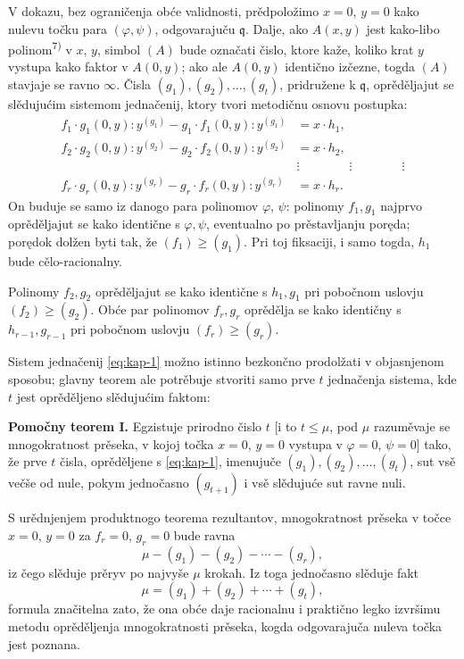 \documentclass[11pt]{article}
\theoremstyle{plain}
\begin{document}
V dokazu, bez ograničenja obće validnosti, prědpoložimo $x = 0$,
$y = 0$ kako nulevu točku para $(\varphi, \psi)$, odgovarajuču
$\mathfrak{q}$. Dalje, ako $A(x,y)$ jest kako-libo polinom\textsuperscript{7)}
v $x$, $y$, simbol $(A)$ bude označati čislo, ktore kaže, koliko
krat $y$ vystupa kako faktor v $A(0,y)$; ako ale $A(0,y)$
identično izčezne, togda $(A)$ stavjaje se ravno $\infty$. Čisla
$(g_{1}), (g_{2}), \ldots, (g_{t})$, pridružene k $\mathfrak{q}$,
oprěděljajut se slědujućim sistemom jednačenij, ktory tvori
metodičnu osnovu postupka:
\begin{equation}\label{eq:kap-1}
\begin{aligned}
f_{1}\cdot g_{1}(0,y):y^{(g_{1})} - g_{1}\cdot f_{1}(0,y):y^{(g_{1})} &= x\cdot h_{1},\\
f_{2}\cdot g_{2}(0,y):y^{(g_{2})} - g_{2}\cdot f_{2}(0,y):y^{(g_{2})} &= x\cdot h_{2},\\
&\vdots \qquad\qquad\vdots\qquad\qquad\vdots\\
f_{r}\cdot g_{r}(0,y):y^{(g_{r})} - g_{r}\cdot f_{r}(0,y):y^{(g_{r})} &= x\cdot h_{r}.
\end{aligned}
\end{equation}
On buduje se samo iz danogo para polinomov $\varphi$, $\psi$:
polinomy $f_{1}, g_{1}$ najprvo oprěděljajut se kako identične s
$\varphi, \psi$, eventualno po prěstavljanju poręda; porędok
dolžen byti tak, že $(f_{1}) \geq (g_{1})$. Pri toj fiksaciji, i
samo togda, $h_{1}$ bude cělo-racionalny.

Polinomy $f_{2}, g_{2}$ oprěděljajut se kako identične s
$h_{1}, g_{1}$ pri pobočnom uslovju $(f_{2}) \geq (g_{2})$. Obće par
polinomov $f_{r}, g_{r}$ oprědělja se kako identičny s
$h_{r-1}, g_{r-1}$ pri pobočnom uslovju $(f_{r}) \geq (g_{r})$.

Sistem jednačenij \eqref{eq:kap-1} možno istinno bezkončno
prodolžati v objasnjenom sposobu; glavny teorem ale potrěbuje
stvoriti samo prve $t$ jednačenja sistema, kde $t$ jest oprěděljeno
slědujućim faktom:

\smallskip
\textbf{Pomočny teorem I.} Egzistuje prirodno čislo $t$ [i to
$t \leq \mu$, pod $\mu$ razuměvaje se mnogokratnost prěseka, v kojoj
točka $x = 0$, $y = 0$ vystupa v $\varphi = 0$, $\psi = 0$] tako, že
prve $t$ čisla, oprěděljene s \eqref{eq:kap-1}, imenujuče
$(g_{1}), (g_{2}), \ldots, (g_{t})$, sut vsě večše od nule, pokym
jednočasno $(g_{t+1})$ i vsě slědujuće sut ravne nuli.

S urědnjenjem produktnogo teorema rezultantov, mnogokratnost
prěseka v točce $x = 0$, $y = 0$ za $f_{r} = 0$, $g_{r} = 0$ bude
ravna
\[
\mu - (g_{1}) - (g_{2}) - \cdots - (g_{r}),
\]
iz čego slěduje prěryv po najvyše $\mu$ krokah. Iz toga jednočasno
slěduje fakt
\begin{equation}\label{eq:kap-2}
\mu = (g_{1}) + (g_{2}) + \cdots + (g_{t}),
\end{equation}
formula značitelna zato, že ona obće daje racionalnu i praktično
legko izvršimu metodu oprěděljenja mnogokratnosti prěseka, kogda
odgovarajuča nuleva točka jest poznana.
\end{document}
